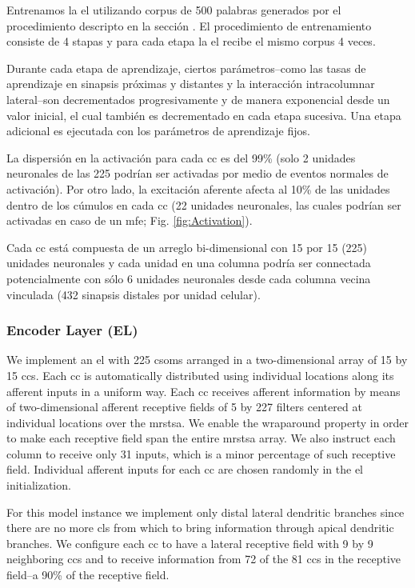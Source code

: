 {Entrenamos la \gls{el} utilizando corpus de 500 palabras generados por el procedimiento descripto en la sección .
El procedimiento de entrenamiento consiste de 4 stapas y para cada etapa la \gls{el} recibe el mismo corpus 4 veces.

Durante cada etapa de aprendizaje, ciertos parámetros--como las tasas de aprendizaje en sinapsis próximas y distantes y la interacción intracolumnar lateral--son decrementados progresivamente y de manera exponencial desde un valor inicial, el cual también es decrementado en cada etapa sucesiva.
Una etapa adicional es ejecutada con los parámetros de aprendizaje fijos.

La dispersión en la activación para cada \gls{cc} es del 99\% (solo 2 unidades neuronales de las 225 podrían ser activadas por medio de eventos normales de activación).
Por otro lado, la excitación aferente afecta al 10\% de las unidades dentro de los cúmulos en cada \gls{cc}
(22 unidades neuronales, las cuales podrían ser activadas en caso de un \gls{mfe}; Fig. \ref{fig:Activation}).

Cada \gls{cc} está compuesta de un arreglo bi-dimensional con 15 por 15 (225) unidades neuronales y
cada unidad en una columna podría ser connectada potencialmente con sólo 6 unidades neuronales desde cada columna vecina vinculada
(432 sinapsis distales por unidad celular).
}{
\subsubsection{Encoder Layer (EL)}

We implement an \gls{el} with 225 \glspl{csom} arranged in a two-dimensional
array of 15 by 15 \glspl{cc}. Each \gls{cc} is automatically distributed using individual locations along its afferent inputs in a uniform way.
Each \gls{cc} receives afferent information by means of
two-dimensional afferent receptive fields of 5 by 227 filters centered at individual locations over the \gls{mrstsa}.
We enable the wraparound property in order to make each receptive field span the entire
\gls{mrstsa} array.
We also instruct each column to receive only 31 inputs, which is a minor percentage of such
receptive field.
Individual afferent inputs for each \gls{cc} are chosen randomly in the \gls{el} initialization. 

For this model instance we implement only distal lateral dendritic branches since there are
no more \glspl{cl} from which to bring information through apical dendritic branches.
We configure each \gls{cc} to have a lateral receptive field with 9 by 9 neighboring \glspl{cc}
and to receive information from 72 of the 81 \glspl{cc} in the receptive field--a 90\% of the receptive field.

}
